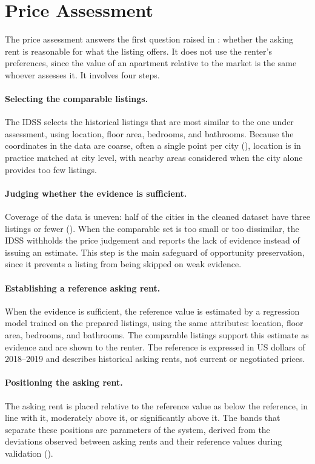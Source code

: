 \documentclass[12pt,a4paper]{report}
\begin{document}
\section{Price Assessment}

The price assessment answers the first question raised in
: whether the asking rent is reasonable for what the
listing offers. It does not use the renter's preferences, since the value
of an apartment relative to the market is the same whoever assesses it. It
involves four steps.

\paragraph{Selecting the comparable listings.} The IDSS selects the historical
listings that are most similar to the one under assessment, using location,
floor area, bedrooms, and bathrooms. Because the coordinates in the data
are coarse, often a single point per city (), location is in practice matched
at city level, with nearby areas considered when the city alone provides
too few listings.

\paragraph{Judging whether the evidence is sufficient.} Coverage of the data is uneven:
half of the cities in the cleaned dataset have three listings or fewer
().
When the comparable set is too small or too dissimilar, the IDSS withholds
the price judgement and reports the lack of evidence instead of issuing an
estimate. This step is the main safeguard of opportunity preservation,
since it prevents a listing from being skipped on weak evidence.

\paragraph{Establishing a reference asking rent.} When the evidence is sufficient, the
reference value is estimated by a regression model trained on the prepared
listings, using the same attributes: location, floor area, bedrooms, and
bathrooms. The comparable listings support this estimate as evidence and
are shown to the renter. The
reference is expressed in US dollars of 2018--2019 and describes historical asking
rents, not current or negotiated prices.

\paragraph{Positioning the asking rent.} The asking rent is placed relative to the
reference value as below the reference, in line with it, moderately above
it, or significantly above it. The bands that separate these positions are
parameters of the system, derived from the deviations observed between
asking rents and their reference values during validation
().
\end{document}
